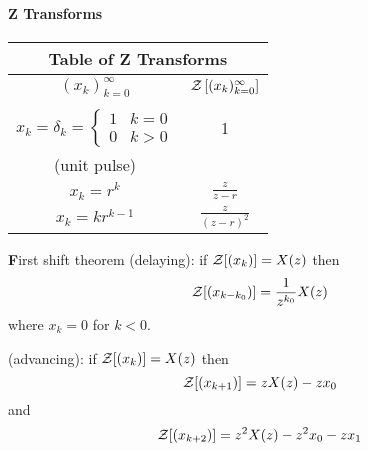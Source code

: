 
\paragraph{Z Transforms}
\begin{center}
\large
\begin{tabular}{|c|c|}
\hline
\multicolumn{2}{|c|}{\textbf Table of Z Transforms}\\
\hline
$ (x_k)_{k=0}^\infty$ &  ${\cal Z}\left[(x_k)_{k=0}^\infty \right]$\\
\hline
&\\[1mm]
$x_k =\delta_k= \left\{ \begin{array}{ll} 1 & k = 0\\
   				 0 & k > 0
		\end{array} \right.$              & 1\\
(unit pulse)                 & \\[8mm]
$x_k = r^k$  & $\displaystyle\frac{z}{z-r}$\\[8mm]

$x_k = kr^{k-1}$  & $\displaystyle\frac{z}{(z-r)^2}$\\[8mm]

\hline
\end{tabular}
\end{center}
{\textbf First shift theorem} (delaying):  if ${\cal Z}[(x_k)]=X(z)$ then
\[
{\cal Z}[(x_{k-k_0})]=\frac{1}{z^{k_0}}X(z)
\]
where $x_k=0$ for $k<0$.

 (advancing): if ${\cal Z}[(x_k)]=X(z)$ then
\[
{\cal Z}[(x_{k+1})]=zX(z)-zx_0
\]
and
\[
{\cal Z}[(x_{k+2})]=z^2X(z)-z^2x_0-zx_1
\]

